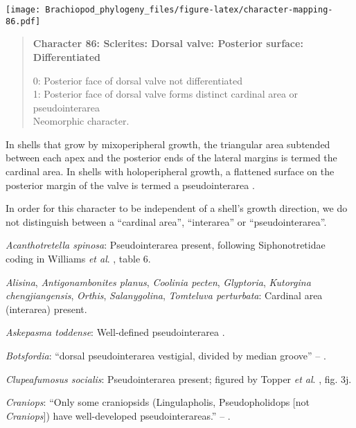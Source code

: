 \documentclass[openany]{book}
\theoremstyle{definition}
\theoremstyle{definition}
\theoremstyle{definition}
\theoremstyle{remark}
\begin{document}
\texttt{[image: Brachiopod\_phylogeny\_files/figure-latex/character-mapping-86.pdf]}

\begin{quote}
\textbf{Character 86: Sclerites: Dorsal valve: Posterior surface:
Differentiated}

0: Posterior face of dorsal valve not differentiated\\
1: Posterior face of dorsal valve forms distinct cardinal area or
pseudointerarea\\
Neomorphic character.
\end{quote}

In shells that grow by mixoperipheral growth, the triangular area
subtended between each apex and the posterior ends of the lateral
margins is termed the cardinal area. In shells with holoperipheral
growth, a flattened surface on the posterior margin of the valve is
termed a pseudointerarea
\citep[paraphrasing][]{Williams1997Introduction}.

In order for this character to be independent of a shell's growth
direction, we do not distinguish between a ``cardinal area'',
``interarea'' or ``pseudointerarea''.

\hypertarget{Acanthotretella_spinosa-coding-86}{}
\emph{Acanthotretella spinosa}: Pseudointerarea present, following
Siphonotretidae coding in Williams \emph{et al}.
\citeyearpar{Williams2000LinguliformeaCraniiformea}, table 6.

\hypertarget{Alisina-coding-86}{}
\emph{Alisina}, \emph{Antigonambonites planus}, \emph{Coolinia pecten},
\emph{Glyptoria}, \emph{Kutorgina chengjiangensis}, \emph{Orthis},
\emph{Salanygolina}, \emph{Tomteluva perturbata}: Cardinal area
(interarea) present.

\hypertarget{Askepasma_toddense-coding-86}{}
\emph{Askepasma toddense}: Well-defined pseudointerarea
\citep[p153]{Williams2000LinguliformeaCraniiformea}.

\hypertarget{Botsfordia-coding-86}{}
\emph{Botsfordia}: ``dorsal pseudointerarea vestigial, divided by median
groove'' -- \citet{Williams2000LinguliformeaCraniiformea}.

\hypertarget{Clupeafumosus_socialis-coding-86}{}
\emph{Clupeafumosus socialis}: Pseudointerarea present; figured by
Topper \emph{et al}. \citeyearpar{Topper2013Reappraisalof}, fig. 3j.

\hypertarget{Craniops-coding-86}{}
\emph{Craniops}: ``Only some craniopsids (Lingulapholis, Pseudopholidops
{[}not \emph{Craniops}{]}) have well-developed pseudointerareas.'' --
\citet{Williams2000LinguliformeaCraniiformea}.
\end{document}

